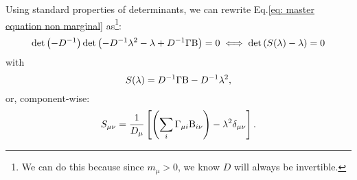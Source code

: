 \documentclass[12pt, titlepage]{report}
\begin{document}
Using standard properties of determinants, we can rewrite Eq.\eqref{eq: master equation non marginal} as\footnote{We can do this because since $m_\mu > 0$, we know $D$ will always be invertible.}:
\begin{equation}
\det\left(-D^{-1}\right)\det\left(-D^{-1}\lambda^2-\lambda+D^{-1}\Gamma\text{B}\right)=0\iff {\det\left(S(\lambda)-\lambda\right)=0} \label{eq: eigenvalue problem S}
\end{equation}
with
\begin{equation}
S(\lambda)=D^{-1}\Gamma\text{B}-D^{-1}\lambda^2, \label{eq: equation stability S}
\end{equation}
or, component-wise:
\begin{equation}
S_{\mu \nu} = \frac{1}{D_\mu}\left[\left(\sum_i \Gamma_{\mu i}\text{B}_{i \nu}\right) - \lambda^2 \delta_{\mu\nu}\right] \label{eq: definition S component wise}.
\end{equation}
\end{document}
